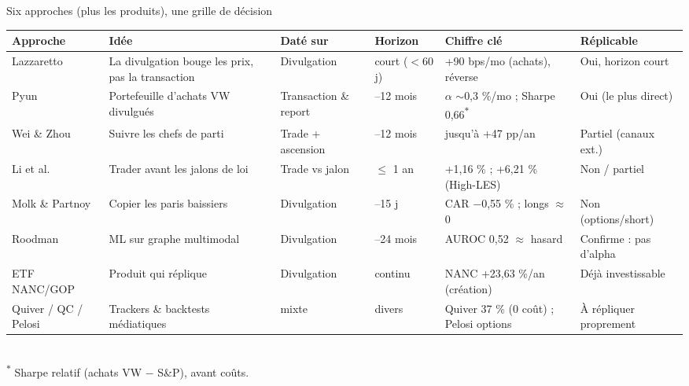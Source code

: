 \documentclass[11pt,aspectratio=169]{beamer}
\begin{document}
\begin{frame}{Six approches (plus les produits), une grille de décision}
  \centering
  {\scriptsize\setlength{\tabcolsep}{3.5pt}\setlength{\extrarowheight}{1pt}
  \begin{tabular}{@{}>{\raggedright\arraybackslash}p{1.7cm}>{\raggedright\arraybackslash}p{2.9cm}>{\raggedright\arraybackslash}p{1.5cm}>{\raggedright\arraybackslash}p{1.4cm}>{\raggedright\arraybackslash}p{3.0cm}>{\raggedright\arraybackslash}p{1.9cm}@{}}
    \toprule
    \textbf{Approche} & \textbf{Idée} & \textbf{Daté sur} & \textbf{Horizon} & \textbf{Chiffre clé} & \textbf{Réplicable} \\
    \midrule
    Lazzaretto & La divulgation bouge les prix, pas la transaction & Divulgation & court ($<$60 j) & +90 bps/mo (achats), réverse & Oui, horizon court \\
    Pyun & Portefeuille d'achats VW divulgués & Transaction \& report & 1--12 mois & $\alpha$ $\sim$0,3 \%/mo ; Sharpe 0,66\textsuperscript{$\ast$} & Oui (le plus direct) \\
    Wei \& Zhou & Suivre les chefs de parti & Trade + ascension & 6--12 mois & jusqu'à +47 pp/an & Partiel (canaux ext.) \\
    Li et al. & Trader avant les jalons de loi & Trade vs jalon & $\leq$ 1 an & +1,16 \% ; +6,21 \% (High-LES) & Non / partiel \\
    Molk \& Partnoy & Copier les paris baissiers & Divulgation & 10--15 j & CAR $-$0,55 \% ; longs $\approx$0 & Non (options/short) \\
    Roodman & ML sur graphe multimodal & Divulgation & 18--24 mois & AUROC 0,52 $\approx$ hasard & Confirme : pas d'alpha \\
    \midrule
    ETF NANC/GOP & Produit qui réplique & Divulgation & continu & NANC +23,63 \%/an (création) & Déjà investissable \\
    Quiver / QC / Pelosi & Trackers \& backtests médiatiques & mixte & divers & Quiver 37 \% (0 coût) ; Pelosi options & À répliquer proprement \\
    \bottomrule
  \end{tabular}}\\[1mm]
  {\scriptsize\color{black!60} \textsuperscript{$\ast$} Sharpe relatif (achats VW $-$ S\&P), avant coûts.}
\end{frame}
\end{document}
